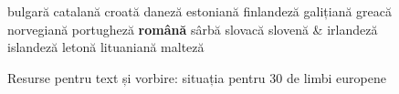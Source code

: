 \begin{figure}[tb]
\begin{tabular}
bulgară\newline 
catalană \newline 
croată \newline 
daneză \newline 
estoniană \newline 
finlandeză \newline 
galițiană \newline 
greacă \newline 
norvegiană \newline 
portugheză \newline 
\textbf{română} \newline 
sârbă \newline 
slovacă \newline 
slovenă \newline
& \vspace*{0.5mm} irlandeză \newline 
islandeză \newline 
letonă \newline 
lituaniană \newline 
malteză \\
\end{tabular}
\caption{Resurse pentru text și vorbire: situația pentru 30 de limbi europene}
\label{fig:resources_cluster_de}
\end{figure}

\clearpage


